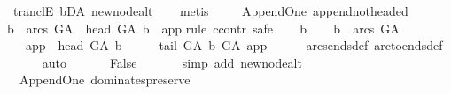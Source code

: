 \begin{isabellebody}
\ tranclE\ bD{\isacharunderscore}{\kern0pt}A\ new{\isacharunderscore}{\kern0pt}node{\isacharunderscore}{\kern0pt}alt\isanewline
\ \ \isamarkupfalse%
\ metis%
\endisatagproof
{\isafoldproof}%
%
\isadelimproof
\ \ \isanewline
%
\endisadelimproof
\isanewline
\isanewline
{}\isamarkupfalse%
\ {\isacharparenleft}{\kern0pt}\ Append{\isacharunderscore}{\kern0pt}One{\isacharparenright}{\kern0pt}\ append{\isacharunderscore}{\kern0pt}not{\isacharunderscore}{\kern0pt}headed{\isacharcolon}{\kern0pt}\isanewline
{\isachardoublequoteopen}{\isasymforall}b\ {\isasymin}\ arcs\ G{\isacharunderscore}{\kern0pt}A{\isachardot}{\kern0pt}\ {\isasymnot}\ head\ G{\isacharunderscore}{\kern0pt}A\ b\ {\isacharequal}{\kern0pt}\ app{\isachardoublequoteclose}\isanewline
%
\isadelimproof
%
\endisadelimproof
%
\isatagproof
{}\isamarkupfalse%
{\isacharparenleft}{\kern0pt}rule\ ccontr{\isacharcomma}{\kern0pt}\ safe{\isacharparenright}{\kern0pt}\isanewline
\ \ \isamarkupfalse%
\ b\isanewline
\ \ \isamarkupfalse%
\ {\isachardoublequoteopen}b\ {\isasymin}\ arcs\ G{\isacharunderscore}{\kern0pt}A{\isachardoublequoteclose}\isanewline
\ \ \ {\isachardoublequoteopen}app\ {\isacharequal}{\kern0pt}\ head\ G{\isacharunderscore}{\kern0pt}A\ b{\isachardoublequoteclose}\isanewline
\ \ \isamarkupfalse%
\ \isamarkupfalse%
\ {\isachardoublequoteopen}tail\ G{\isacharunderscore}{\kern0pt}A\ b\ {\isasymrightarrow}\isactrlbsub G{\isacharunderscore}{\kern0pt}A\isactrlesub \ app{\isachardoublequoteclose}\isanewline
\ \ \ \ \isamarkupfalse%
\ arcs{\isacharunderscore}{\kern0pt}ends{\isacharunderscore}{\kern0pt}def\ arc{\isacharunderscore}{\kern0pt}to{\isacharunderscore}{\kern0pt}ends{\isacharunderscore}{\kern0pt}def\isanewline
\ \ \ \ \isamarkupfalse%
\ auto\ \isanewline
\ \ \isamarkupfalse%
\ \isamarkupfalse%
\ False\ \isanewline
\ \ \ \ \isamarkupfalse%
\ {\isacharparenleft}{\kern0pt}simp\ add{\isacharcolon}{\kern0pt}\ new{\isacharunderscore}{\kern0pt}node{\isacharunderscore}{\kern0pt}alt{\isacharparenright}{\kern0pt}\ \isanewline
{}\isamarkupfalse%
%
\endisatagproof
{\isafoldproof}%
%
\isadelimproof
\isanewline
%
\endisadelimproof
\ \ \isanewline
{}\isamarkupfalse%
\ {\isacharparenleft}{\kern0pt}\ Append{\isacharunderscore}{\kern0pt}One{\isacharparenright}{\kern0pt}\ dominates{\isacharunderscore}{\kern0pt}preserve{\isacharcolon}{\kern0pt}\isanewline

\end{isabellebody}
